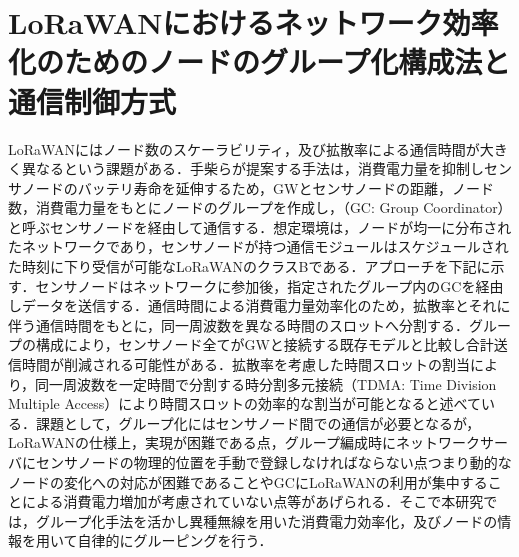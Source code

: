 \section{LoRaWANにおけるネットワーク効率化のためのノードのグループ化構成法と通信制御方式}
LoRaWANにはノード数のスケーラビリティ，及び拡散率による通信時間が大きく異なるという課題がある．手柴らが提案する手法\cite{Obana2018}は，消費電力量を抑制しセンサノードのバッテリ寿命を延伸するため，GWとセンサノードの距離，ノード数，消費電力量をもとにノードのグループを作成し，（GC: Group Coordinator）と呼ぶセンサノードを経由して通信する．想定環境は，ノードが均一に分布されたネットワークであり，センサノードが持つ通信モジュールはスケジュールされた時刻に下り受信が可能なLoRaWANのクラスBである．アプローチを下記に示す．センサノードはネットワークに参加後，指定されたグループ内のGCを経由しデータを送信する．通信時間による消費電力量効率化のため，拡散率とそれに伴う通信時間をもとに，同一周波数を異なる時間のスロットへ分割する．グループの構成により，センサノード全てがGWと接続する既存モデルと比較し合計送信時間が削減される可能性がある．拡散率を考慮した時間スロットの割当により，同一周波数を一定時間で分割する時分割多元接続（TDMA: Time Division Multiple Access）により時間スロットの効率的な割当が可能となると述べている．課題として，グループ化にはセンサノード間での通信が必要となるが，LoRaWANの仕様上，実現が困難である点，グループ編成時にネットワークサーバにセンサノードの物理的位置を手動で登録しなければならない点つまり動的なノードの変化への対応が困難であることやGCにLoRaWANの利用が集中することによる消費電力増加が考慮されていない点等があげられる．そこで本研究では，グループ化手法を活かし異種無線を用いた消費電力効率化，及びノードの情報を用いて自律的にグルーピングを行う．